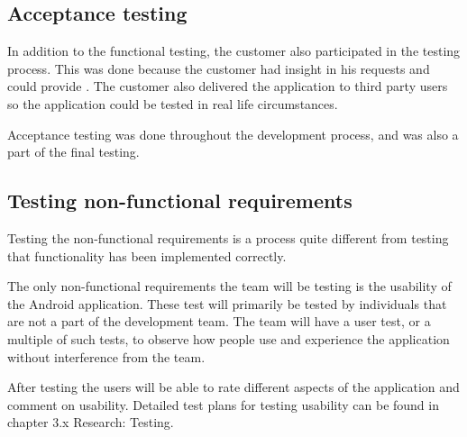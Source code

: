 \subsection{Acceptance testing}
In addition to the functional testing, the customer also participated in the testing process. This was done because the customer had insight in his requests and could provide . The customer also delivered the application to third party users so the application could be tested in real life circumstances.

Acceptance testing was done throughout the development process, and was also a part of the final testing.

 
\subsection{Testing non-functional requirements}
\label{sec:testingnonfunctionalrequirements}
Testing the non-functional requirements is a process quite different from testing that functionality has been implemented correctly.

The only non-functional requirements the team will be testing is the usability of the Android application. These test will primarily be 
tested by individuals that are not a part of the development team. The team will have a user test, or a multiple of such tests, to observe how people use and experience the application without interference from the team. 

After testing the users will be able to rate different aspects of the application and comment on usability. Detailed 
test plans for testing usability can be found in chapter 3.x Research: Testing.